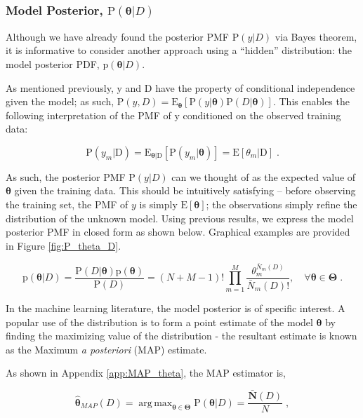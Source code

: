 \documentclass[12pt]{article}
\DeclareMathOperator*{\argmax}{arg\,max}
\begin{document}
\subsubsection{Model Posterior, $\text{P}(\bm{\theta} | D)$}

Although we have already found the posterior PMF $\text{P}(y | D)$ via Bayes theorem, it is informative to consider another approach using a ``hidden'' distribution: the model posterior PDF, $\text{p}(\bm{\theta} | D)$. 

As mentioned previously, $\mathrm{y}$ and $\mathrm{D}$ have the property of conditional independence given the model; as such, $\text{P}(y,D) = \text{E}_{\bm{\theta}} \left[ \text{P}(y | \bm{\theta}) \text{P}(D | \bm{\theta}) \right]$. This enables the following interpretation of the PMF of $\mathrm{y}$ conditioned on the observed training data:

\begin{equation}
\text{P}(y_m | \mathrm{D}) = \text{E}_{\bm{\theta} | \mathrm{D}} \left[ \text{P}(y_m|\bm{\theta}) \right] = \text{E}\left[ \theta_m | \mathrm{D} \right] \;.
\end{equation}

As such, the posterior PMF $\text{P}(y | D)$ can we thought of as the expected value of $\bm{\theta}$ given the training data. This should be intuitively satisfying -- before observing the training set, the PMF of $y$ is simply $\text{E}[\bm{\theta}]$; the observations simply refine the distribution of the unknown model. Using previous results, we express the model posterior PMF in closed form as shown below. Graphical examples are provided in Figure \ref{fig:P_theta_D}.

\begin{equation} \label{P_t_D}
\text{p}(\bm{\theta} | D) = \frac{\text{P}(D | \bm{\theta}) \text{p}(\bm{\theta})}{\text{P}(D)}
= (N+M-1)! \prod_{m=1}^M \frac{\theta_m^{\bar{N}_m(D)}}{\bar{N}_m(D)!} ,  \quad  \forall \bm{\theta} \in \bm{\Theta} \;.
\end{equation}


In the machine learning literature, the model posterior is of specific interest. A popular use of the distribution is to form a point estimate of the model $\bm{\theta}$ by finding the maximizing value of the distribution - the resultant estimate is known as the Maximum \emph{a posteriori} (MAP) estimate. 

As shown in Appendix \ref{app:MAP_theta}, the MAP estimator is,

\begin{equation}
\hat{\bm{\theta}}_{MAP}(D) = \argmax_{\bm{\theta} \in \bm{\Theta}} \text{P}(\bm{\theta} | D) = \frac{\bar{\bm{N}}(D)}{N} \;,
\end{equation}
\end{document}
